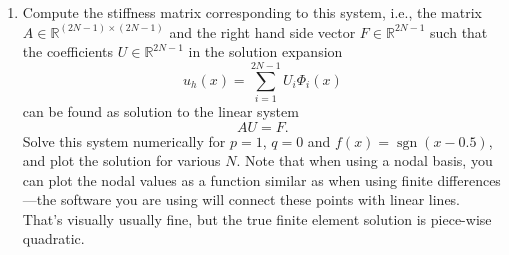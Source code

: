 \documentclass[11pt]{article}
\begin{document}
\begin{enumerate}
\begin{enumerate}
    \item Compute the stiffness matrix corresponding to this system,
      i.e., the matrix $A\in \mathbb R^{(2N-1)\times (2N-1)}$ and the 
      right hand side vector $F\in \mathbb R^{2N-1}$ such that the
      coefficients $U\in \mathbb R^{2N-1}$ in the solution expansion
      \begin{equation*}
        u_h(x) = \sum_{i=1}^{2N-1}U_i\Phi_i(x)
      \end{equation*}
      can be found as solution to the linear system
      \begin{equation*}
        A U = F.
      \end{equation*}
      Solve this system numerically for $p=1$, $q=0$ and
      $f(x)=\operatorname{sgn}(x-0.5)$, and plot the solution for various
      $N$. Note that when using a nodal basis, you can plot the nodal
      values as a function similar as when using finite
      differences---the software you are using will connect these
      points with linear lines. That's visually usually fine, but the
      true finite element solution is piece-wise quadratic.\\
\\


\end{enumerate}
\end{enumerate}
\end{document}
